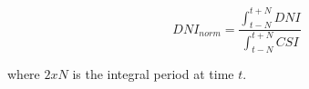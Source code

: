 \documentclass[conference]{IEEEtran}
\begin{document}

\begin{equation}
DNI_{norm}=\frac{\int_{t-N}^{t+N}DNI}{\int_{t-N}^{t+N} CSI}
\label{eq:radnorm}
\end{equation}

where $2xN$ is the integral period at time $t$.



\end{document}
